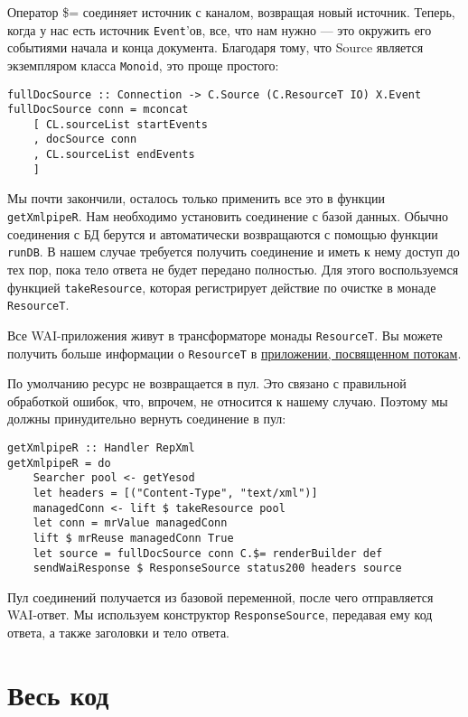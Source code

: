 Оператор \$= соединяет источник с каналом, возвращая новый источник. Теперь, когда у нас есть источник \lstinline!Event!'ов, все, что нам нужно --- это окружить его событиями начала и конца документа. Благодаря тому, что Source является экземпляром класса \lstinline!Monoid!, это проще простого:

\begin{lstlisting}
fullDocSource :: Connection -> C.Source (C.ResourceT IO) X.Event
fullDocSource conn = mconcat
    [ CL.sourceList startEvents
    , docSource conn
    , CL.sourceList endEvents
    ]
\end{lstlisting}

Мы почти закончили, осталось только применить все это в функции \lstinline!getXmlpipeR!. Нам необходимо установить соединение с базой данных. Обычно соединения с БД берутся и автоматически возвращаются с помощью функции \lstinline!runDB!. В нашем случае требуется получить соединение и иметь к нему доступ до тех пор, пока тело ответа не будет передано полностью. Для этого воспользуемся функцией \lstinline!takeResource!, которая регистрирует действие по очистке в монаде \lstinline!ResourceT!.

\begin{remark}
Все WAI-приложения живут в трансформаторе монады \lstinline!ResourceT!. Вы можете получить больше информации о \lstinline!ResourceT! в \hyperref[chap:conduit]{приложении, посвященном потокам}.%
\end{remark}

По умолчанию ресурс не возвращается в пул. Это связано с правильной обработкой ошибок, что, впрочем, не относится к нашему случаю. Поэтому мы должны принудительно вернуть соединение в пул:

\begin{lstlisting}
getXmlpipeR :: Handler RepXml
getXmlpipeR = do
    Searcher pool <- getYesod
    let headers = [("Content-Type", "text/xml")]
    managedConn <- lift $ takeResource pool
    let conn = mrValue managedConn
    lift $ mrReuse managedConn True
    let source = fullDocSource conn C.$= renderBuilder def
    sendWaiResponse $ ResponseSource status200 headers source
\end{lstlisting}

Пул соединений получается из базовой переменной, после чего отправляется WAI-ответ. Мы используем конструктор \lstinline!ResponseSource!, передавая ему код ответа, а также заголовки и тело ответа.

\section{Весь код} %


